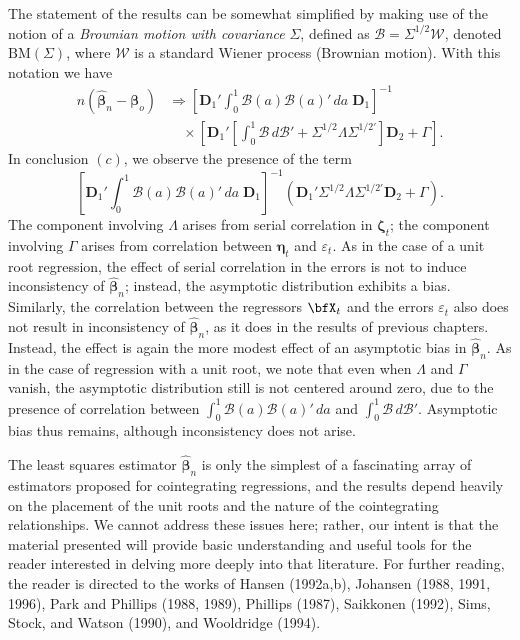 The statement of the results can be somewhat simplified by making use of the notion of a \emph{Brownian motion with covariance} $\Sigma$, defined as $\boldsymbol{\mathcal{B}} = \Sigma^{1/2}\boldsymbol{\mathcal{W}}$, denoted $\text{BM}(\Sigma)$, where $\boldsymbol{\mathcal{W}}$ is a standard Wiener process (Brownian motion). With this notation we have
\begin{align*}
n(\hat{\boldsymbol{\beta}}_n - \boldsymbol{\beta}_o) &\Rightarrow \left[\mathbf{D}_1'\int_0^1 \boldsymbol{\mathcal{B}}(a)\boldsymbol{\mathcal{B}}(a)'\,da\;\mathbf{D}_1\right]^{-1} \\
&\quad \times \left[\mathbf{D}_1'\left[\int_0^1 \boldsymbol{\mathcal{B}}\,d\boldsymbol{\mathcal{B}}' + \Sigma^{1/2}\Lambda\Sigma^{1/2\prime}\right]\mathbf{D}_2 + \Gamma\right].
\end{align*}
In conclusion $(c)$, we observe the presence of the term
\[
\left[\mathbf{D}_1'\int_0^1 \boldsymbol{\mathcal{B}}(a)\boldsymbol{\mathcal{B}}(a)'\,da\;\mathbf{D}_1\right]^{-1}\left(\mathbf{D}_1'\Sigma^{1/2}\Lambda\Sigma^{1/2\prime}\mathbf{D}_2 + \Gamma\right).
\]
The component involving $\Lambda$ arises from serial correlation in $\boldsymbol{\zeta}_t$; the component involving $\Gamma$ arises from correlation between $\boldsymbol{\eta}_t$ and $\varepsilon_t$. As in the case of a unit root regression, the effect of serial correlation in the errors is not to induce inconsistency of $\hat{\boldsymbol{\beta}}_n$; instead, the asymptotic distribution exhibits a bias. Similarly, the correlation between the regressors $\bfX_t$ and the errors $\varepsilon_t$ also does not result in inconsistency of $\hat{\boldsymbol{\beta}}_n$, as it does in the results of previous chapters. Instead, the effect is again the more modest effect of an asymptotic bias in $\hat{\boldsymbol{\beta}}_n$. As in the case of regression with a unit root, we note that even when $\Lambda$ and $\Gamma$ vanish, the asymptotic distribution still is not centered around zero, due to the presence of correlation between $\int_0^1 \boldsymbol{\mathcal{B}}(a)\boldsymbol{\mathcal{B}}(a)'\,da$ and $\int_0^1 \boldsymbol{\mathcal{B}}\,d\boldsymbol{\mathcal{B}}'$. Asymptotic bias thus remains, although inconsistency does not arise.

The least squares estimator $\hat{\boldsymbol{\beta}}_n$ is only the simplest of a fascinating array of estimators proposed for cointegrating regressions, and the results depend heavily on the placement of the unit roots and the nature of the cointegrating relationships. We cannot address these issues here; rather, our intent is that the material presented will provide basic understanding and useful tools for the reader interested in delving more deeply into that literature. For further reading, the reader is directed to the works of Hansen (1992a,b), Johansen (1988, 1991, 1996), Park and Phillips (1988, 1989), Phillips (1987), Saikkonen (1992), Sims, Stock, and Watson (1990), and Wooldridge (1994).

